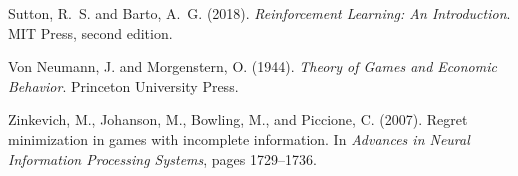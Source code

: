 \documentclass[11pt,a4paper]{article}
\begin{document}
\begin{thebibliography}{99}
Sutton, R.~S. and Barto, A.~G. (2018).
\newblock \emph{Reinforcement Learning: An Introduction}.
\newblock MIT Press, second edition.

Von Neumann, J. and Morgenstern, O. (1944).
\newblock \emph{Theory of Games and Economic Behavior}.
\newblock Princeton University Press.

Zinkevich, M., Johanson, M., Bowling, M., and Piccione, C. (2007).
\newblock Regret minimization in games with incomplete information.
\newblock In \emph{Advances in Neural Information Processing Systems}, pages 1729--1736.

\end{thebibliography}
\end{document}
